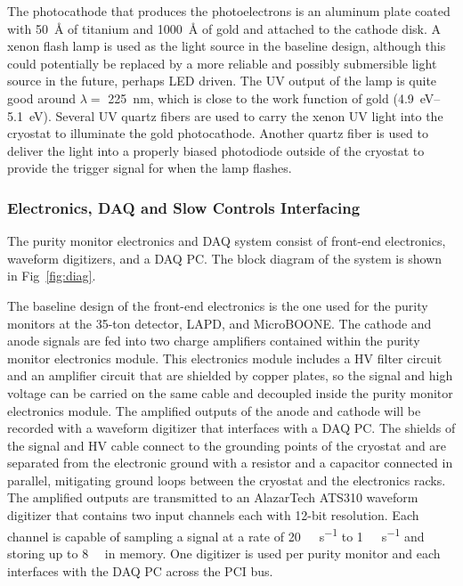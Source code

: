 The photocathode that produces the photoelectrons is an aluminum plate coated with \SI{50}{\angstrom} of titanium and \SI{1000}{\angstrom} of gold and attached to the cathode disk. A xenon flash lamp is used as the light source in the baseline design, although this could potentially be replaced by a more reliable and possibly submersible light source in the future, perhaps LED driven. The UV output of the lamp is quite good around $\lambda=$ \SI{225}{\nano\meter}, which is close to the work function of gold (\SIrange{4.9}{5.1}{\eV}). Several UV quartz fibers are used to carry the xenon UV light into the cryostat to illuminate the gold photocathode.   Another quartz fiber is used to deliver the light into a properly biased photodiode outside of the cryostat to provide the trigger signal for when the lamp flashes. 

\subsubsection{Electronics, DAQ and Slow Controls Interfacing}
The purity monitor electronics and DAQ system consist of front-end electronics, waveform digitizers, and a DAQ PC.  The block diagram of the system is shown in Fig~\ref{fig:diag}. 

The baseline design of the front-end electronics is the one used for the purity monitors at the 35-ton detector, LAPD, and MicroBOONE. The cathode and anode signals are fed into two charge amplifiers contained within the purity monitor electronics module. This electronics module includes a HV filter circuit and an amplifier circuit that are shielded by copper plates, so the signal and high voltage can be carried on the same cable and decoupled inside the purity monitor electronics module. The amplified outputs of the anode and cathode will be recorded with a waveform digitizer that interfaces with a DAQ PC. The shields of the signal and HV cable connect to the grounding points of the cryostat and are separated from the electronic ground with a resistor and a capacitor connected in parallel, mitigating ground loops between the cryostat and the electronics racks. The amplified outputs are transmitted to an AlazarTech ATS310 waveform digitizer that contains two input channels each with 12-bit resolution. Each channel is capable of sampling a signal at a rate of \SI{20}{\mega\samples\per\second} to \SI{1}{\kilo\samples\per\second} and storing up to \SI{8}{\mega\samples} in memory. One digitizer is used per purity monitor and each interfaces with the DAQ PC across the PCI bus. 


